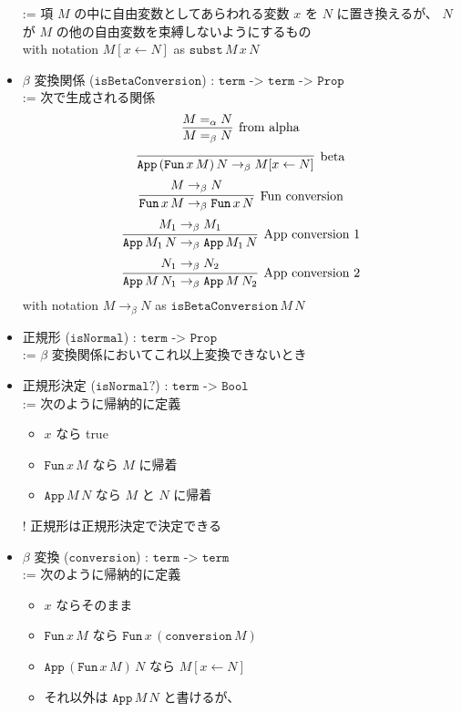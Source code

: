 \documentclass[dvipdfmx]{jsarticle}
\begin{document}
\begin{itemize}
    := 項 \(M\) の中に自由変数としてあらわれる変数 \(x\) を \(N\) に置き換えるが、 \(N\) が \(M\) の他の自由変数を束縛しないようにするもの \\
    with notation \(M[x \leftarrow N]\) as \(\texttt{subst} \, M \, x \, N\)
  \item \(\beta\) 変換関係 (\(\texttt{isBetaConversion}\)) : \(\texttt{term -> term -> Prop}\) \\
    := 次で生成される関係
      \[\infer[\text{from alpha}]{M =_{\beta} N}{M =_{\alpha} N}\]
      \[\infer[\text{beta}]{\texttt{App} \, (\texttt{Fun} \, x \, M) \, N \to_{\beta} M[x \leftarrow N]}{}\]
      \[\infer[\text{Fun conversion}]{\texttt{Fun} \, x \, M \to_{\beta} \texttt{Fun} \, x \, N}{M \to_{\beta} N}\]
      \[\infer[\text{App conversion 1}]{\texttt{App} \, M_1 \, N \to_{\beta} \texttt{App} \, M_1 \, N}{M_1 \to_{\beta} M_1}\]
      \[\infer[\text{App conversion 2}]{\texttt{App} \, M \, N_1 \to_{\beta} \texttt{App} \, M \, N_2}{N_1 \to_{\beta} N_2}\]
    with notation \(M \to_{\beta} N\) as \(\texttt{isBetaConversion} \, M \, N\)
  \item 正規形 (\(\texttt{isNormal}\)) : \(\texttt{term -> Prop}\) \\
    := \(\beta\) 変換関係においてこれ以上変換できないとき
  \item 正規形決定 (\(\texttt{isNormal?}\)) : \(\texttt{term -> Bool}\) \\
    := 次のように帰納的に定義
      \begin{itemize}
        \item \(x\) なら true
        \item \(\texttt{Fun} \, x \, M\) なら \(M\) に帰着
        \item \(\texttt{App} \, M \, N\) なら \(M\) と \(N\) に帰着
      \end{itemize}
  \item[!] 正規形は正規形決定で決定できる
  \item \(\beta\) 変換 (\(\texttt{conversion}\)) : \(\texttt{term -> term}\) \\
  := 次のように帰納的に定義
    \begin{itemize}
      \item \(x\) ならそのまま
      \item \(\texttt{Fun} \, x \, M\) なら \(\texttt{Fun} \, x \, (\texttt{conversion} \, M)\)
      \item \(\texttt{App} \, (\texttt{Fun} \, x \, M) \, N\) なら \(M[x \leftarrow N]\)
      \item それ以外は \(\texttt{App} \, M \, N\) と書けるが、

\end{itemize}
\end{itemize}
\end{document}
